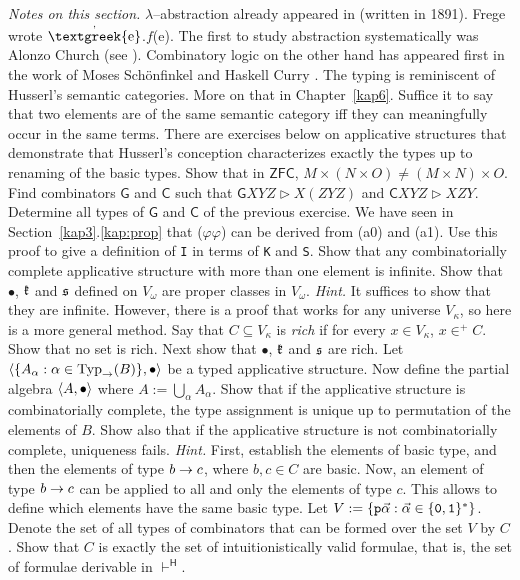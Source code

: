 {\it Notes on this section.} $\lambda$--abstraction already
appeared in \cite{frege:funktion} (written in 1891). 
Frege wrote $\stackrel{\boldmath{,}}{\mbox{\textgreek{e}}}$.$f$(\textgreek{e}). 
The first to study abstraction systematically was Alonzo Church 
(see \cite{church:foundation}). Combinatory logic on the other hand has 
appeared first in the work of Moses Sch\"onfinkel 
 and Haskell
Curry . The typing is reminiscent of 
Husserl's 
semantic categories. More on that in
Chapter~\ref{kap6}. Suffice it to say that two elements are of the
same semantic category iff they can meaningfully occur in the same
terms. There are exercises below on applicative structures that
demonstrate that Husserl's conception characterizes exactly the
types up to renaming of the basic types.
\vplatz
\exercise
Show that in $\mathsf{ZFC}$,  $M \times (N \times O) \neq 
(M \times N) \times O$. 
\vplatz%
\exercise%
Find combinators $\mathsf{G}$ and $\mathsf{C}$ such that $\mathsf{G}XYZ
\triangleright X(ZYZ)$ and $\mathsf{C}XYZ \triangleright XZY$.
\vplatz%
\exercise%
Determine all types of $\mathsf{G}$ and $\mathsf{C}$ of the previous
exercise.
\vplatz%
\exercise%
\label{ex:ski}%
We have seen in Section~\ref{kap3}.\ref{kap:prop} that 
{\mtt ($\varphi$$\varphi$)} can be derived from (a0) and 
(a1). Use this proof to give a
definition of {\tt I} in terms of {\tt K} and {\tt S}.
\vplatz
\exercise
Show that any combinatorially complete applicative structure with
more than one element is infinite.
\vplatz
\exercise
Show that $\bullet$, $\mathfrak{k}$ and $\mathfrak{s}$ defined on $V_{\omega}$
are proper classes in $V_{\omega}$. {\it Hint.} It suffices
to show that they are infinite. However, there is a proof that 
works for any universe $V_{\kappa}$, so here is a more general 
method. Say that $C \subseteq V_{\kappa}$ is {\it rich\/} if for 
every $x \in V_{\kappa}$, $x \in^+ C$. Show that no set is rich. 
Next show that $\bullet$, $\mathfrak{k}$ and $\mathfrak{s}$ are rich.
\vplatz%
\exercise%
Let $\auf \{A_{\alpha} : \alpha \in \Typ_{\pf}(B)\}, %
\bullet\zu$ be a typed applicative structure. Now define the 
partial algebra $\langle A, \bullet\rangle$ where $A :=
\bigcup_{\alpha} A_{\alpha}$. Show that if the applicative
structure is combinatorially complete, the type assignment is
unique up to permutation of the elements of $B$. Show also that if
the applicative structure is not combinatorially complete,
uniqueness fails. {\it Hint.} First, establish the elements of
basic type, and then the elements of type $b \rightarrow c$, where $b, c
\in C$ are basic. Now, an element of type $b \rightarrow c$ can be applied 
to all and only the elements of type $c$. This allows
to define which elements have the same basic type. 
\vplatz%
\exercise%
Let $V := \{\mbox{\tt p}\vec{\alpha} :
\vec{\alpha} \in \{\mbox{\tt 0}, \mbox{\tt 1}\}^{\ast}\}$. Denote
the set of all types of combinators that can be formed over the
set $V$ by $C$. Show that $C$ is exactly the set of
intuitionistically valid formulae, that is, the set of formulae
derivable in $\vdash^{\mathsf{H}}$.
